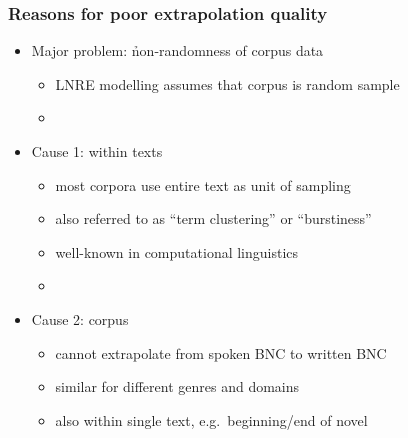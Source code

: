 \documentclass[t]{beamer} %
\begin{document}
\begin{frame}
  \frametitle{Reasons for poor extrapolation quality}

  \begin{itemize}
  \item Major problem: \h{non-randomness} of corpus data
    \begin{itemize}
    \item LNRE modelling assumes that corpus is random sample
    \item[]
    \end{itemize}
  \item<2-> Cause 1:  within texts
    \begin{itemize}
    \item most corpora use entire text as unit of sampling
    \item also referred to as ``term clustering'' or ``burstiness''
    \item well-known in computational linguistics \citep{Church:00}
    \item[]
    \end{itemize}
  \item<3-> Cause 2:  corpus
    \begin{itemize}
    \item cannot extrapolate from spoken BNC to written BNC 
    \item similar for different genres and domains
    \item also within single text, e.g.\ beginning/end of novel
    \end{itemize}
  \end{itemize}
\end{frame}
\end{document}
